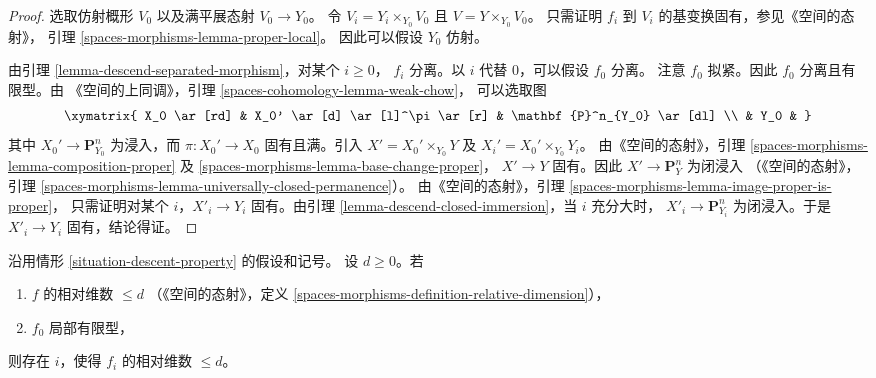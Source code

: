 \begin{proof}
选取仿射概形 $V_0$ 以及满平展态射 $V_0 \to Y_0$。
令 $V_i = Y_i \times_{Y_0} V_0$ 且 $V = Y \times_{Y_0} V_0$。
只需证明 $f_i$ 到 $V_i$ 的基变换固有，参见《空间的态射》，
引理 \ref{spaces-morphisms-lemma-proper-local}。
因此可以假设 $Y_0$ 仿射。

\medskip\noindent
由引理 \ref{lemma-descend-separated-morphism}，对某个 $i \geq 0$，
$f_i$ 分离。以 $i$ 代替 $0$，可以假设 $f_0$ 分离。
注意 $f_0$ 拟紧。因此 $f_0$ 分离且有限型。由
《空间的上同调》，引理 \ref{spaces-cohomology-lemma-weak-chow}，
可以选取图
$$
\xymatrix{
X_0 \ar[rd] & X_0' \ar[d] \ar[l]^\pi \ar[r] & \mathbf{P}^n_{Y_0} \ar[dl] \\
& Y_0 &
}
$$
其中 $X_0' \to \mathbf{P}^n_{Y_0}$ 为浸入，而
$\pi : X_0' \to X_0$ 固有且满。引入
$X' = X_0' \times_{Y_0} Y$ 及 $X_i' = X_0' \times_{Y_0} Y_i$。
由《空间的态射》，引理
\ref{spaces-morphisms-lemma-composition-proper} 及
\ref{spaces-morphisms-lemma-base-change-proper}，
$X' \to Y$ 固有。因此 $X' \to \mathbf{P}^n_Y$ 为闭浸入
（《空间的态射》，引理
\ref{spaces-morphisms-lemma-universally-closed-permanence}）。
由《空间的态射》，引理
\ref{spaces-morphisms-lemma-image-proper-is-proper}，
只需证明对某个 $i$，$X'_i \to Y_i$ 固有。由引理
\ref{lemma-descend-closed-immersion}，当 $i$ 充分大时，
$X'_i \to \mathbf{P}^n_{Y_i}$ 为闭浸入。于是
$X'_i \to Y_i$ 固有，结论得证。
\end{proof}

\begin{lemma}
\label{lemma-eventually-relative-dimension}
沿用情形 \ref{situation-descent-property} 的假设和记号。
设 $d \geq 0$。若
\begin{enumerate}
\item $f$ 的相对维数 $\leq d$
（《空间的态射》，定义
\ref{spaces-morphisms-definition-relative-dimension}），
\item $f_0$ 局部有限型，
\end{enumerate}
则存在 $i$，使得 $f_i$ 的相对维数 $\leq d$。
\end{lemma}

